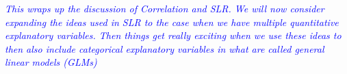 \textit{\textcolor{blue}{This wraps up the discussion of Correlation and SLR.  We will now consider expanding the ideas used in SLR to the case when we have multiple quantitative explanatory variables.  Then things get really exciting when we use these ideas to then also include categorical explanatory variables in what are called general linear models (GLMs)}}





